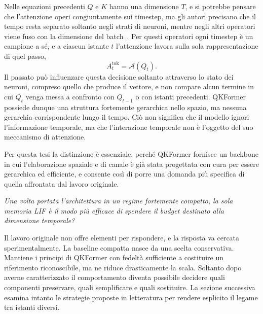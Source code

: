 Nelle equazioni precedenti $Q$ e $K$ hanno una dimensione $T$, e si potrebbe pensare che l'attenzione operi congiuntamente sui timestep, ma gli autori precisano che il tempo resta separato soltanto negli strati di neuroni, mentre negli altri operatori viene fuso con la dimensione del batch~\cite{zhou2024qkformer}. Per questi operatori ogni timestep è un campione a sé, e a ciascun istante $t$ l'attenzione lavora sulla sola rappresentazione di quel passo,
\begin{equation}
\label{eq:attenzione_istante_t}
A^{\mathrm{tok}}_t = \mathcal{A}(Q_t).
\end{equation}
Il passato può influenzare questa decisione soltanto attraverso lo stato dei neuroni, compreso quello che produce il vettore, e non compare alcun termine in cui $Q_t$ venga messa a confronto con $Q_{t-1}$ o con istanti precedenti. QKFormer possiede dunque una struttura fortemente gerarchica nello spazio, ma nessuna gerarchia corrispondente lungo il tempo. Ciò non significa che il modello ignori l'informazione temporale, ma che l'interazione temporale non è l'oggetto del suo meccanismo di attenzione.

Per questa tesi la distinzione è essenziale, perché QKFormer fornisce un backbone in cui l'elaborazione spaziale e di canale è già stata progettata con cura per essere gerarchica ed efficiente, e consente così di porre una domanda più specifica di quella affrontata dal lavoro originale.
\begin{center}
\emph{Una volta portata l'architettura in un regime fortemente compatto, la sola memoria LIF è il modo più efficace di spendere il budget destinato alla dimensione temporale?}
\end{center}
Il lavoro originale non offre elementi per rispondere, e la risposta va cercata sperimentalmente. La baseline compatta nasce da una scelta conservativa. Mantiene i principi di QKFormer con fedeltà sufficiente a costituire un riferimento riconoscibile, ma ne riduce drasticamente la scala. Soltanto dopo averne caratterizzato il comportamento diventa possibile decidere quali componenti preservare, quali semplificare e quali sostituire. La sezione successiva esamina intanto le strategie proposte in letteratura per rendere esplicito il legame tra istanti diversi.





